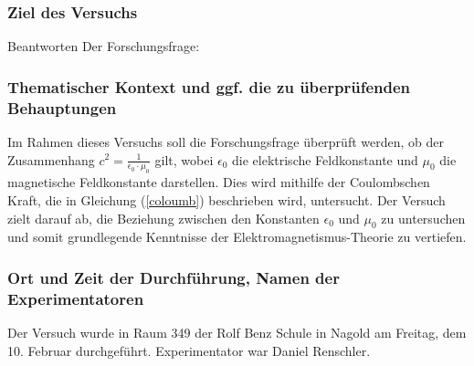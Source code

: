 \documentclass{report}
\begin{document}
\subsubsection{Ziel des Versuchs} %
\label{ssub:Ziel des Versuchs}
Beantworten Der Forschungsfrage:


\subsubsection{Thematischer Kontext und ggf. die zu überprüfenden Behauptungen} %
\label{ssub:Thematischer Kontext und ggf. die zu überprüfenden Behauptungen}
Im Rahmen dieses Versuchs soll die Forschungsfrage überprüft werden, ob der
Zusammenhang $c^2 = \frac{1}{\epsilon_0 \cdot \mu_0}$ gilt, wobei $\epsilon_0$
die elektrische Feldkonstante und $\mu_0$ die magnetische Feldkonstante
darstellen. Dies wird mithilfe der Coulombschen Kraft, die in Gleichung
(\ref{coloumb}) beschrieben wird, untersucht. Der Versuch zielt darauf ab, die
Beziehung zwischen den Konstanten $\epsilon_0$ und $\mu_0$ zu untersuchen und
somit grundlegende Kenntnisse der Elektromagnetismus-Theorie zu vertiefen.



\subsubsection{Ort und Zeit der Durchführung, Namen der Experimentatoren} %
\label{ssub:Ort-und-Zeit-der-Durchführung-Namen-der-Experimentatoren}
Der Versuch wurde in Raum 349 der Rolf Benz Schule in Nagold am Freitag, dem
10. Februar durchgeführt. Experimentator war Daniel Renschler.
\end{document}
